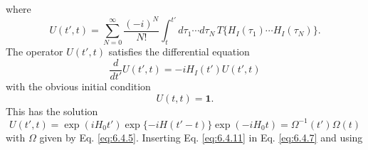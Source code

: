 where
\begin{equation}
U(t',t)=\sum_{N=0}^{\infty}\frac{(-i)^N}{N!}
\int_t^{t'}d\tau_1\cdots d\tau_N\,
T\{H_I(\tau_1)\cdots H_I(\tau_N)\}.
\tag{6.4.8}
\label{eq:6.4.8}
\end{equation}
The operator $U(t',t)$ satisfies the differential equation
\begin{equation}
\frac{d}{dt'}U(t',t)=-iH_I(t')U(t',t)
\tag{6.4.9}
\label{eq:6.4.9}
\end{equation}
with the obvious initial condition
\begin{equation}
U(t,t)=\mathbf{1}.
\tag{6.4.10}
\label{eq:6.4.10}
\end{equation}
This has the solution
\begin{equation}
U(t',t)=\exp(iH_0t')\exp\{-iH(t'-t)\}\exp(-iH_0t)
=\Omega^{-1}(t')\Omega(t)
\tag{6.4.11}
\label{eq:6.4.11}
\end{equation}
with $\Omega$ given by Eq. \eqref{eq:6.4.5}. Inserting Eq. \eqref{eq:6.4.11} in Eq. \eqref{eq:6.4.7} and
using\space%
